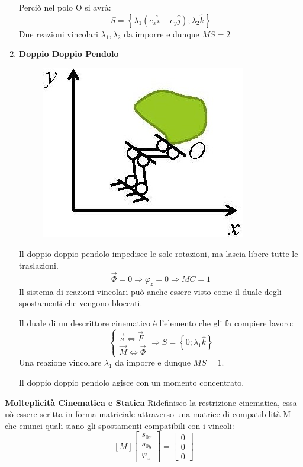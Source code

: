\documentclass{article}
\begin{document}
\begin{adjustwidth}{2in}{}
\begin{enumerate}
Perciò nel polo O si avrà:
\[
S = \left\lbrace \lambda_{1} (e_{x}\hat{i} + e_{y}\hat{j}); \lambda_{2}\hat{k}\right\rbrace 
\]
Due reazioni vincolari $\lambda_{1}, \lambda_{2}$ da imporre e dunque $MS = 2$

\item \textbf{Doppio Doppio Pendolo}\newline
\begin{figure}[H]
	\centering
	\includegraphics[width=0.25\linewidth]{"immagini/1.PARTE1_Pagina_38"}
\end{figure}
Il doppio doppio pendolo impedisce le sole rotazioni, ma lascia libere tutte le traslazioni.
\[ 
	\vec{\Phi} = 0 \Rightarrow	\varphi_{z} = 0 \Rightarrow MC = 1
\]
Il sistema di reazioni vincolari può anche essere visto come il duale degli
spostamenti che vengono bloccati.

Il duale di un descrittore cinematico è l’elemento che gli fa compiere lavoro:
\[
\begin{cases}
\vec{s} \Leftrightarrow \vec{F} \\
\vec{M} \Leftrightarrow \vec{\Phi}
\end{cases} \Rightarrow S = \left\lbrace 0; \lambda_{1}\hat{k}\right\rbrace
\]
Una reazione vincolare $\lambda_{1}$ da imporre e dunque $MS =1$.

Il doppio doppio pendolo agisce con un momento concentrato. 
\end{enumerate}
 
 \newpage
 {\Large \textbf{Molteplicità Cinematica e Statica}} \mbox{} \newline
 Ridefinisco la restrizione cinematica, essa uò essere scritta in forma matriciale attraverso una matrice di compatibilità M che enunci quali siano gli spostamenti compatibili con i vincoli:
 \[
[M]\left[\begin{array}{c}
	s_{0x} \\
	s_{0y} \\
	\varphi_{z}
\end{array}\right] = \left[\begin{array}{c}
0 \\
0 \\
0
\end{array}\right] 
\]


\end{adjustwidth}
\end{document}
